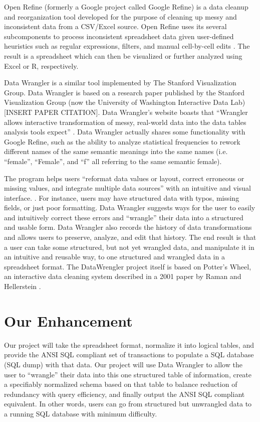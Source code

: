 \documentclass{../sty/acm_proc_article-sp}
\begin{document}
Open Refine (formerly a Google project called Google Refine) is a data cleanup and reorganization tool developed for the purpose of cleaning up messy and inconsistent data from a CSV/Excel source. Open Refine uses its several subcomponents to process inconsistent spreadsheet data given user-defined heuristics such as regular expressions, filters, and manual cell-by-cell edits \cite{Refine}. The result is a spreadsheet which can then be visualized or further analyzed using Excel or R, respectively.

Data Wrangler is a similar tool implemented by The Stanford Visualization Group. Data Wrangler is based on a research paper published by the Stanford Visualization Group (now the University of Washington Interactive Data Lab) [INSERT PAPER CITATION]. Data Wrangler's website boasts that ``Wrangler allows interactive transformation of messy, real-world data into the data tables analysis tools expect'' \cite{wrangler-web}. Data Wrangler actually shares some functionality with Google Refine, such as the ability to analyze statistical frequencies to rework different names of the same semantic meanings into the same names (i.e. ``female'', ``Female'', and ``f'' all referring to the same semantic female).

The program helps users ``reformat data values or layout, correct erroneous or missing values, and integrate multiple data sources'' with an intuitive and visual interface. \cite{2011-wrangler}. For instance, users may have structured data with typos, missing fields, or just poor formatting. Data Wrangler suggests ways for the user to easily and intuitively correct these errors and ``wrangle'' their data into a structured and usable form. Data Wrangler also records the history of data transformations and allows users to preserve, analyze, and edit that history. The end result is that a user can take some structured, but not yet wrangled data, and manipulate it in an intuitive and reusable way, to one structured and wrangled data in a spreadsheet format.
The DataWrengler project itself is based on Potter's Wheel, an interactive data cleaning system described in a 2001 paper by Raman and Hellerstein \cite{raman2001potter}.

\section{Our Enhancement}
Our project will take the spreadsheet format, normalize it into logical tables, and provide the ANSI SQL compliant set of transactions to populate a SQL database (SQL dump) with that data. Our project will use Data Wrangler to allow the user to ``wrangle'' their data into this one structured table of information, create a specifiably normalized schema based on that table to balance reduction of redundancy with query efficiency, and finally output the ANSI SQL compliant equivalent. In other words, users can go from structured but unwrangled data to a running SQL database with minimum difficulty.
\end{document}

